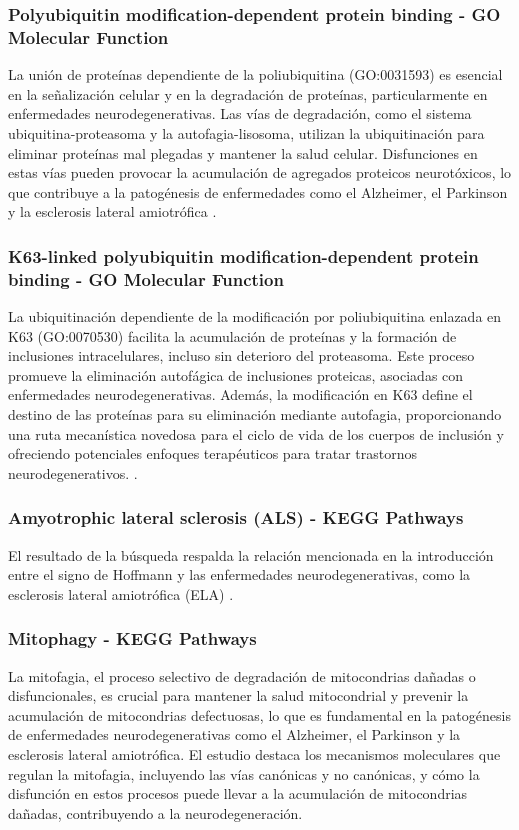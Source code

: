 \subsubsection{Polyubiquitin modification-dependent protein binding - GO Molecular Function}
La unión de proteínas dependiente de la poliubiquitina (GO:0031593) es esencial en la señalización celular y en la degradación de proteínas, particularmente en enfermedades neurodegenerativas. Las vías de degradación, como el sistema ubiquitina-proteasoma y la autofagia-lisosoma, utilizan la ubiquitinación para eliminar proteínas mal plegadas y mantener la salud celular. Disfunciones en estas vías pueden provocar la acumulación de agregados proteicos neurotóxicos, lo que contribuye a la patogénesis de enfermedades como el Alzheimer, el Parkinson y la esclerosis lateral amiotrófica \cite{Schmidt2021}.


\subsubsection{K63-linked polyubiquitin modification-dependent protein binding - GO Molecular Function}
La ubiquitinación dependiente de la modificación por poliubiquitina enlazada en K63 (GO:0070530) facilita la acumulación de proteínas y la formación de inclusiones intracelulares, incluso sin deterioro del proteasoma. Este proceso promueve la eliminación autofágica de inclusiones proteicas, asociadas con enfermedades neurodegenerativas. Además, la modificación en K63 define el destino de las proteínas para su eliminación mediante autofagia, proporcionando una ruta mecanística novedosa para el ciclo de vida de los cuerpos de inclusión y ofreciendo potenciales enfoques terapéuticos para tratar trastornos neurodegenerativos. \cite{10.1093/hmg/ddm320}.


\subsubsection{Amyotrophic lateral sclerosis (ALS) - KEGG Pathways}

El resultado de la búsqueda respalda la relación mencionada en la introducción entre el signo de Hoffmann y las enfermedades neurodegenerativas, como la esclerosis lateral amiotrófica (ELA) \cite{RIANCHO201927}.

\subsubsection{Mitophagy - KEGG Pathways}

La mitofagia, el proceso selectivo de degradación de mitocondrias dañadas o disfuncionales, es crucial para mantener la salud mitocondrial y prevenir la acumulación de mitocondrias defectuosas, lo que es fundamental en la patogénesis de enfermedades neurodegenerativas como el Alzheimer, el Parkinson y la esclerosis lateral amiotrófica\cite{Zhang2022}. El estudio destaca los mecanismos moleculares que regulan la mitofagia, incluyendo las vías canónicas y no canónicas, y cómo la disfunción en estos procesos puede llevar a la acumulación de mitocondrias dañadas, contribuyendo a la neurodegeneración.